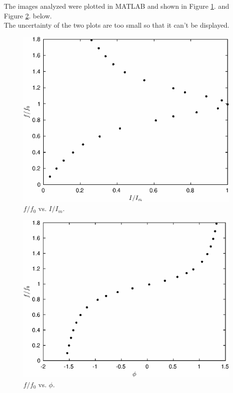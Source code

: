 \documentclass{article}
\begin{document}
The images analyzed were plotted in MATLAB and shown in Figure \ref{fig-4-1}. and Figure \ref{fig-4-2}. below.\\

The uncertainty of the two plots are too small so that it can't be displayed.

\begin{figure}[H]
	\centering
	\includegraphics[scale=0.6]{4_1.eps}
	\caption{$f/f_0$ vs. $I/I_m$.}
	\label{fig-4-1}
\end{figure}

\begin{figure}[H]
	\centering
	\includegraphics[scale=0.6]{4_2.eps}
	\caption{$f/f_0$ vs. $\phi$.}
	\label{fig-4-2}
\end{figure}
\end{document}
